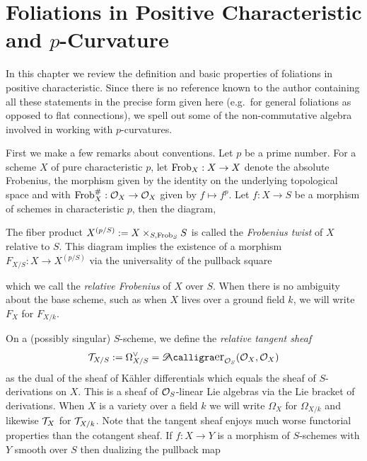 \documentclass[main.tex]{subfiles}
\begin{document}
\chapter{Foliations in Positive Characteristic and $p$-Curvature} \label{chapter:foliations}


In this chapter we review the definition and basic properties of foliations in positive characteristic. Since there is no reference known to the author containing all these statements in the precise form given here (e.g.\ for general foliations as opposed to flat connections), we spell out some of the non-commutative algebra involved in working with $p$-curvatures.
\par 
First we make a few remarks about conventions. Let $p$ be a prime number. For a scheme $X$ of pure characteristic $p$, let $\operatorname{\mathrm{Frob}}_X : X \to X$ denote the absolute Frobenius, the morphism given by the identity on the underlying topological space and with $\operatorname{\mathrm{Frob}}_X^{\#} : \mathcal{O}_X \to \mathcal{O}_X$ given by $f \mapsto f^p$. Let $f : X \to S$ be a morphism of schemes in characteristic $p$, then the diagram,
\begin{center}
\end{center}  
The fiber product $X^{(p/S)} := X \times_{S, \operatorname{\mathrm{Frob}}_S} S$ is called the \textit{Frobenius twist} of $X$ relative to $S$. This diagram implies the existence of a morphism $F_{X/S} : X \to X^{(p/S)}$ via the universality of the pullback square
\begin{center}
\end{center}
which we call the \textit{relative Frobenius} of $X$ over $S$. When there is no ambiguity about the base scheme, such as when $X$ lives over a ground field $k$, we will write $F_{X}$ for $F_{X/k}$. 
\par 
On a (possibly singular) $S$-scheme, we define the \textit{relative tangent sheaf} 
\[ \T_{X/S} := \Omega_{X/S}^{\vee} = \shDer_{\cO_S}(\cO_X, \cO_X) \]
as the dual of the sheaf of K\"{a}hler differentials which equals the sheaf of $S$-derivations on $X$. This is a sheaf of $\mathcal{O}_S$-linear Lie algebras via the Lie bracket of derivations. When $X$ is a variety over a field $k$ we will write $\Omega_{X}$ for $\Omega_{X/k}$ and likewise $\mathcal{T}_{X}$ for $\mathcal{T}_{X/k}$. Note that the tangent sheaf enjoys much worse functorial properties than the cotangent sheaf. If $f : X \to Y$ is a morphism of $S$-schemes with $Y$ smooth over $S$ then dualizing the pullback map
\end{document}
